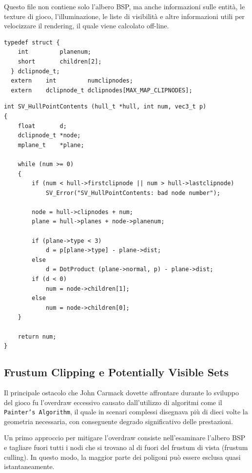 \documentclass[12pt, letterpaper]{article}
\begin{document}
Questo file non contiene solo l'albero BSP, ma anche informazioni sulle entità, le texture di gioco, l'illuminazione, le liste di visibilità e altre informazioni utili per velocizzare il rendering, il quale viene calcolato off-line.
\newpage

\begin{lstlisting}[caption=Nodi dell'albero BSP all'interno di \texttt{bspfile.h} \cite{idsoftware:quake}]
  typedef struct {
    int			planenum;
    short		children[2]; 
  } dclipnode_t;
  extern	int			numclipnodes;
  extern	dclipnode_t	dclipnodes[MAX_MAP_CLIPNODES];

\end{lstlisting}


\begin{lstlisting}[caption=Funzione \texttt{SV\_HullPointContents} all'interno di \texttt{world.c} \cite{idsoftware:quake} che trova la foglia in cui è contenuto un punto p. ]
  int SV_HullPointContents (hull_t *hull, int num, vec3_t p)
{
	float		d;
	dclipnode_t	*node;
	mplane_t	*plane;

	while (num >= 0)
	{
		if (num < hull->firstclipnode || num > hull->lastclipnode)
			SV_Error("SV_HullPointContents: bad node number");
	
		node = hull->clipnodes + num;
		plane = hull->planes + node->planenum;
		
		if (plane->type < 3)
			d = p[plane->type] - plane->dist;
		else
			d = DotProduct (plane->normal, p) - plane->dist;
		if (d < 0)
			num = node->children[1];
		else
			num = node->children[0];
	}
	
	return num;
}
  \end{lstlisting}

\subsection{Frustum Clipping e Potentially Visible Sets}

Il principale ostacolo che John Carmack dovette affrontare durante lo sviluppo del gioco fu l'overdraw eccessivo causato dall'utilizzo di algoritmi come il \texttt{Painter's Algorithm}, il quale in scenari complessi disegnava più di dieci volte la geometria necessaria, con conseguente degrado significativo delle prestazioni.

Un primo approccio per mitigare l'overdraw consiste nell'esaminare l'albero BSP e tagliare fuori tutti i nodi che si trovano al di fuori del frustum di vista (frustum culling). In questo modo, la maggior parte dei poligoni può essere esclusa quasi istantaneamente.
\end{document}
